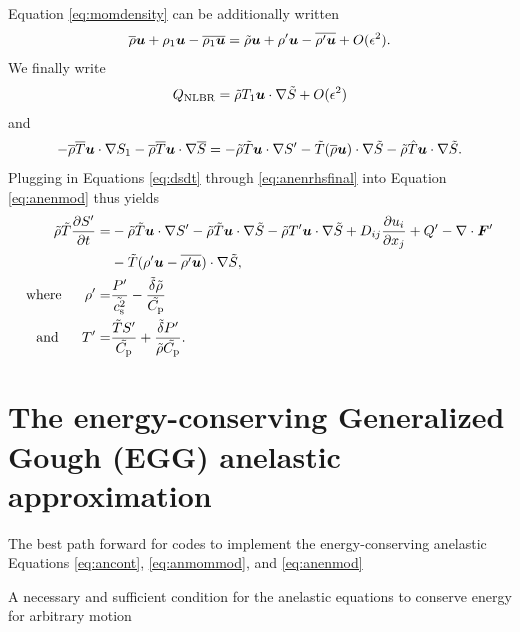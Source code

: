 \documentclass[12pt]{article}
\newcommand{\vecf}{\bm{F}}
\begin{document}
Equation \eqref{eq:momdensity} can be additionally written
  \begin{align}\label{eq:momdensity2}
\overline{\rho}\bm{u} + \rho_1\bm{u} - \overline{\rho_1\bm{u}} = \tilde{\rho}\bm{u} + \rho^\prime\bm{u} - \overline{\rho^\prime\bm{u}} + O(\epsilon^2).
\end{align}
We finally write 
\begin{align}
	Q_{\rm NLBR} = \tilde{\rho}T_1\bm{u}\cdot\nabla\tilde{S} + O(\epsilon^2)
\end{align}
and 
\begin{align}\label{eq:anenrhsfinal}
	-\overline{\rho}\overline{T} \bm{u}\cdot\nabla S_1 - \overline{\rho}\overline{T} \bm{u}\cdot\nabla\overline{S} = -\tilde{\rho}\tilde{T}\bm{u}\cdot\nabla S^\prime - \tilde{T}(\overline{\rho} \bm{u})\cdot\nabla\tilde{S} - \tilde{\rho}\hat{T}\bm{u}\cdot\nabla\tilde{S}.
\end{align}
Plugging in Equations \eqref{eq:dsdt} through \eqref{eq:anenrhsfinal} into Equation \eqref{eq:anenmod} thus yields
\begin{subequations}\label{eq:anenref}
	\begin{align}
		\tilde{\rho}\tilde{T}\pderiv{S^\prime}{t}= &-\tilde{\rho}\tilde{T}\ugrad S^\prime - \tilde{\rho}\tilde{T} \ugrad \tilde{S} - \tilde{\rho} T^\prime\ugrad\tilde{S}+D_{ij}\pderiv{u_i}{x_j} + Q^\prime- \Div\vecf^\prime  \nonumber\\
		& - \tilde{T}(\rho^\prime \vecu-\overline{\rho^\prime\vecu})\cdot\nabla\tilde{S},\\
		\where \rho^\prime =& \frac{P^\prime}{\tilde{\cs^2}}-\frac{\tilde{\delta}\tilde{\rho}}{\tilde{\cpcap}}\\
		\andd T^\prime = & \frac{\tilde{T} S^\prime}{\tilde{\cpcap}} + \frac{\tilde{\delta} P^\prime}{\tilde{\rho}\tilde{\cpcap}}.
	\end{align}
\end{subequations}

\section{The energy-conserving Generalized Gough (EGG) anelastic approximation}
The best path forward for codes to implement the energy-conserving anelastic Equations \eqref{eq:ancont}, \eqref{eq:anmommod}, and \eqref{eq:anenmod}

A necessary and sufficient condition for the anelastic equations to conserve energy for arbitrary motion 
	\newpage
		
\end{document}
